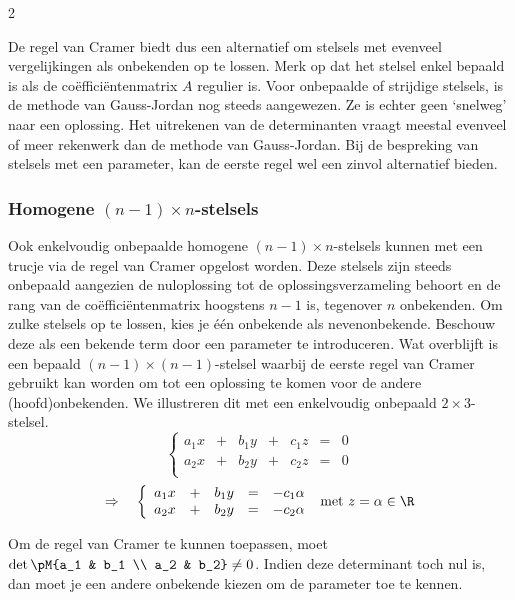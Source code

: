 \begin{multicols}{2}
    
De regel van Cramer biedt dus een alternatief om stelsels met evenveel vergelijkingen als onbekenden op te lossen. Merk op dat het stelsel enkel bepaald is als de co\"effici\"entenmatrix $A$ regulier is. Voor onbepaalde of strijdige stelsels, is de methode van Gauss-Jordan nog steeds aangewezen. Ze is echter geen `snelweg' naar een oplossing. Het uitrekenen van de determinanten vraagt meestal evenveel of meer rekenwerk dan de methode van Gauss-Jordan. Bij de bespreking van stelsels met een parameter, kan de eerste regel wel een zinvol alternatief bieden. 

\subsubsection{Homogene $(n-1)\times n$-stelsels}
Ook enkelvoudig onbepaalde homogene $(n-1)\times n$-stelsels kunnen met een trucje via de regel van Cramer opgelost worden. Deze stelsels zijn steeds onbepaald aangezien de nuloplossing tot de oplossingsverzameling behoort en de rang van de co\"effici\"entenmatrix hoogstens $n-1$ is, tegenover $n$ onbekenden. Om zulke stelsels op te lossen, kies je \'e\'en onbekende als nevenonbekende. Beschouw deze als een bekende term door een parameter te introduceren. Wat overblijft is een bepaald $(n-1)\times (n-1)$-stelsel waarbij de eerste regel van Cramer gebruikt kan worden om tot een oplossing te komen voor de andere (hoofd)onbekenden. We illustreren dit met een enkelvoudig onbepaald $2\times 3$-stelsel.
$$\left\{ \begin{array}{ccccccc} 
        a_{1} x & +  & b_{1} y & + & c_{1} z & = &  0\\
        a_{2} x & +  & b_{2} y & + & c_{2} z & = &  0 \\
        \end{array} \right.  $$
        $$\Rightarrow \quad \left\{ \begin{array}{ccccc} 
        a_{1} x & +  & b_{1} y & = & -c_{1} \alpha \\
        a_{2} x & +  & b_{2} y & = & -c_{2} \alpha \\
        \end{array} \right.  \text{ met } z=\alpha \in \R$$

Om de regel van Cramer te kunnen toepassen, moet $\det \pM{a_1 & b_1 \\ a_2 & b_2} \ne 0$. Indien deze determinant toch nul is, dan moet je een andere onbekende kiezen om de parameter toe te kennen. 


\end{multicols}
